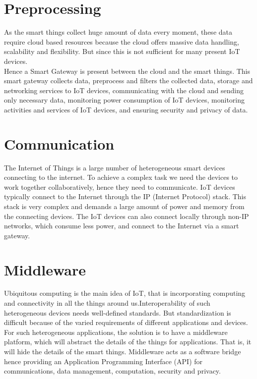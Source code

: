 \documentclass{article}
\begin{document}
\section*{Preprocessing}
As the smart things collect huge amount of data every moment, these data require cloud based resources because the cloud offers massive data handling, scalability and flexibility. But since this is not sufficient for many present IoT devices.\\
Hence a Smart Gateway is present between the cloud and the smart things. This smart gateway collects data, preprocess and filters the collected data, storage and networking services to IoT devices, communicating with the cloud and sending only necessary data, monitoring power consumption of IoT devices, monitoring activities and services of IoT devices, and ensuring security and privacy of data.


\section*{Communication}
The Internet of Things is a large number of heterogeneous smart devices connecting to the internet. To achieve a complex task we need the devices to work together collaboratively, hence they need to communicate. IoT devices typically connect to the Internet through the IP (Internet Protocol) stack. This stack is very complex and demands a large amount of power and memory from the connecting devices. The IoT devices can also connect locally through non-IP networks, which consume less power, and connect to the Internet via a smart gateway.

\section*{Middleware}
Ubiquitous computing is the main idea of IoT, that is incorporating computing and connectivity in all the things around us.Interoperability of such heterogeneous devices needs well-defined standards. But standardization is difficult because of the varied requirements of different applications and devices. For such heterogeneous applications, the solution is to have a middleware platform, which will abstract the details of the things for applications. That is, it will hide the details of the smart things. Middleware acts as a software bridge hence providing an Application Programming Interface (API) for communications, data management, computation, security and privacy.
\\
\\
\end{document}
